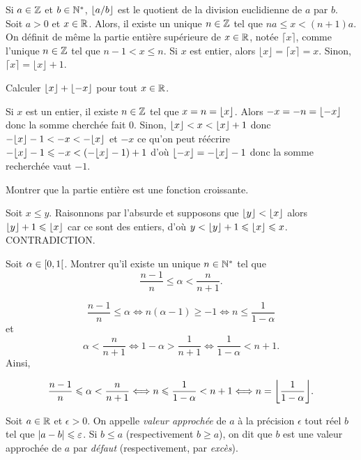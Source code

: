 \documentclass{magnoliaold}
\begin{document}
\begin{remarques}
  \remarque Si $a\in\mathbb{Z}$ et $b\in{\mathbb{N}^*}$, $\left\lfloor a/b\right\rfloor$ est le quotient de la division euclidienne de $a$ par $b$.
  \remarque Soit $a>0$ et $x\in\mathbb{R}$. Alors, il existe un unique $n\in\mathbb{Z}$
    tel que $na\leq x < (n+1)a$.
  \remarque  On définit de même la partie entière supérieure de $x\in\mathbb{R}$,
    notée $\lceil x\rceil$, comme l'unique $n\in\mathbb{Z}$ tel que $n-1<x\leq n$. Si $x$
    est entier, alors $\lfloor x\rfloor=\lceil x\rceil=x$. Sinon,
    $\lceil x\rceil=\lfloor x\rfloor+1$.
\end{remarques}

\begin{exos}
\exo Calculer $\left\lfloor x\right\rfloor+\left\lfloor-x\right\rfloor$ pour tout $x\in\mathbb{R}$.
\begin{sol}
Si $x$ est un entier, il existe $n\in \mathbb{Z}$ tel que $x=n=\left\lfloor x\right\rfloor$. Alors $-x=-n=\left\lfloor-x\right\rfloor$ donc la somme cherchée fait $0$.
Sinon, $\left\lfloor x\right\rfloor<x<\left\lfloor x\right\rfloor+1$ donc $-\ent{x}-1<-x<-\ent{x}$ et $-x$ ce qu'on peut réécrire $-\ent{x}-1\leq -x<\p{-\ent{x}-1}+1$ d'où $\ent{-x}=-\ent{x}-1$ donc la somme recherchée vaut $-1$.
\end{sol}
\exo Montrer que la partie entière est une fonction croissante.
\begin{sol}
Soit $x\leq y$. Raisonnons par l'absurde et supposons que $\left\lfloor y\right\rfloor<\left\lfloor x\right\rfloor$ alors $\left\lfloor y\right\rfloor+1\leqslant \left\lfloor x\right\rfloor$ car ce sont des entiers, d'où $y<\left\lfloor y\right\rfloor+1\leqslant \left\lfloor x\right\rfloor\leqslant x$. CONTRADICTION.
\end{sol}
\exo Soit $\alpha\in\left[0,1\right[$. Montrer qu'il existe un unique
  $n\in{\mathbb{N}^*}$ tel que
  \[\frac{n-1}{n}\leq \alpha<\frac{n}{n+1}.\]
  \begin{sol}
$$\frac{n-1}{n}\leq \alpha \Longleftrightarrow n(\alpha-1)\geq -1 \Longleftrightarrow n\leq \frac{1}{1-\alpha} $$
et $$\alpha<\frac{n}{n+1} \Longleftrightarrow 1-\alpha > \frac{1}{n+1} \Longleftrightarrow \frac{1}{1-\alpha}<n+1.$$
Ainsi,

$$\frac{n-1}{n}\leq \alpha<\frac{n}{n+1} \Longleftrightarrow n\leq \frac{1}{1-\alpha}<n+1\Longleftrightarrow n=\ent{\frac{1}{1-\alpha}}.$$
  \end{sol}
\end{exos}



\begin{definition}[utile=-3]
Soit $a\in\mathbb{R}$ et $\epsilon>0$. On appelle \emph{valeur approchée} de $a$ à la précision
$\epsilon$ tout réel $b$ tel que $\left|a-b\right|\leqslant\varepsilon$.
Si $b\leq a$ (respectivement $b\geq a$), on dit que $b$ est une valeur approchée
de $a$ par \emph{défaut} (respectivement, par \emph{excès}).
\end{definition}
\end{document}
